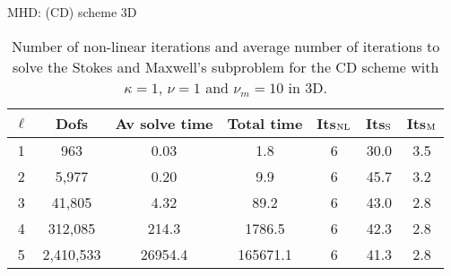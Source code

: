 \documentclass{beamer}
\newcommand{\re}[1]{{\textcolor{red}       {#1}}}
\renewcommand{\div}{\nabla\cdot\,}
\renewcommand{\div}{\nabla\cdot\,}
\begin{document}
\begin{frame}{{MHD: (CD) scheme 3D}}
  \begin{table}[h!] \small
\begin{center}
\begin{tabular}{ccccccc}
\hline
 $\ell$ &    Dofs &  Av solve time &  Total time &   Its$_{\rm NL}$ &     Its$_{\rm S}$ &    Its$_{\rm M}$\\
\hline
 1 &    963 &       0.03 & 1.8 & 6 &        30.0 &        3.5 \\
 2 &   5,977 &       0.20 & 9.9 &                  6 &        45.7 &        3.2 \\
 3 &  41,805 &       4.32 & 89.2 & 6 &        43.0 &        2.8 \\
  4 &  312,085 &     214.3 &         1786.5 & 6 &     42.3 &        2.8 \\
5 &  2,410,533 &   26954.4 &       165671.1 & 6 &        41.3 &        2.8 \\
\hline
\end{tabular}
\caption{Number of non-linear iterations and average number of iterations to solve the Stokes and Maxwell's subproblem for the CD scheme with $\kappa = 1$, $\nu = 1$ and $\nu_m = 10$ in 3D.}
\label{tab:CD3D_large_scale}
\end{center}
\end{table}
\end{frame}



\end{document}
